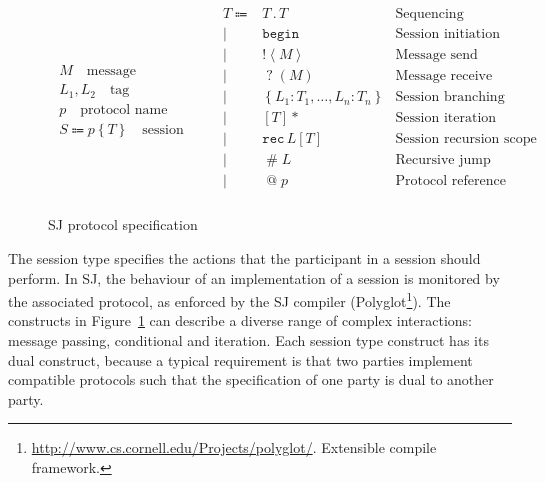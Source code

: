 \documentclass{llncs}
\begin{document}
\begin{figure}
\begin{gather*}
\begin{array}{c}
M\quad\mbox{message}
\\[10pt]
L_1, L_2\quad\mbox{tag}
\\[10pt]
p\quad\mbox{protocol name}
\\[10pt]
S \Coloneqq  p\left\{ T \right\} \quad \mbox{session}
\end{array}
\qquad
\begin{array}{rlr}
T \Coloneqq & T\mathbin{.}T & \mbox{Sequencing} \\ 
       \mid & \texttt{begin} & \mbox{Session initiation} \\
       \mid & \mathopen{!}\left<M\right> & \mbox{Message send} \\ 
       \mid & \mathopen{?}\left(M\right) & \mbox{Message receive} \\
       \mid & \left\{L_1 \colon T_1,\dots, L_n \colon T_n \right\} & \mbox{Session branching} \\ %
       \mid & \left[T\right]* & \mbox{Session iteration} \\ 
       \mid & \texttt{rec}\,L\left[T\right] & \mbox{Session recursion scope} \\ 
       \mid & \mathopen{\#}L & \mbox{Recursive jump} \\ 
       \mid & \mathopen{@}p & \mbox{Protocol reference} \\
\end{array}
\end{gather*}
\caption{SJ protocol specification}\label{tab:prot-spec} 
\end{figure}

The session type specifies the actions that the participant in a session should perform. In SJ, the behaviour of an implementation of a session is monitored by the associated protocol, as enforced by the SJ compiler (Polyglot\footnote{\url{http://www.cs.cornell.edu/Projects/polyglot/}. Extensible compile framework.}). The constructs in Figure~\ref{tab:prot-spec} can describe a diverse range of complex interactions: message passing, conditional and iteration. Each session type construct has its dual construct, because a typical requirement is that two parties implement compatible protocols such that the specification of one party is dual to another party.
\end{document}
